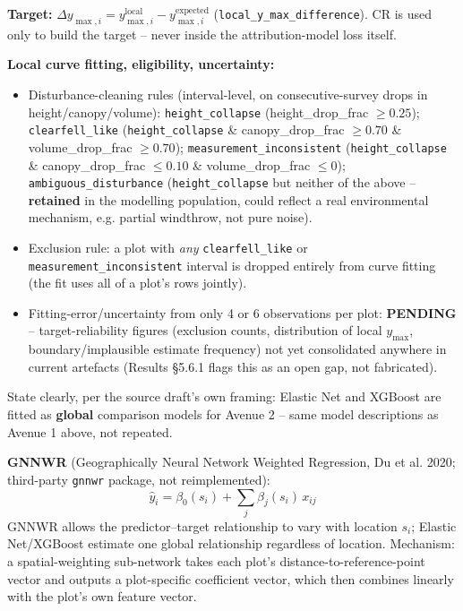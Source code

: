 \textbf{Target:} $\Delta y_{\max,i} = y_{\max,i}^{\text{local}} - y_{\max,i}^{\text{expected}}$
(\texttt{local\_y\_max\_difference}). CR is used only to build the target -- never inside the
attribution-model loss itself.

\textbf{Local curve fitting, eligibility, uncertainty:}
\begin{itemize}
\setlength\itemsep{0pt}
\item Disturbance-cleaning rules (interval-level, on consecutive-survey drops in
height/canopy/volume): \texttt{height\_collapse} (height\_drop\_frac $\ge 0.25$);
\texttt{clearfell\_like} (\texttt{height\_collapse} \& canopy\_drop\_frac $\ge 0.70$ \&
volume\_drop\_frac $\ge 0.70$); \texttt{measurement\_inconsistent} (\texttt{height\_collapse} \&
canopy\_drop\_frac $\le 0.10$ \& volume\_drop\_frac $\le 0$); \texttt{ambiguous\_disturbance}
(\texttt{height\_collapse} but neither of the above -- \textbf{retained} in the modelling
population, could reflect a real environmental mechanism, e.g. partial windthrow, not pure noise).
\item Exclusion rule: a plot with \emph{any} \texttt{clearfell\_like} or
\texttt{measurement\_inconsistent} interval is dropped entirely from curve fitting (the fit uses
all of a plot's rows jointly).
\item Fitting-error/uncertainty from only 4 or 6 observations per plot: \textbf{PENDING} --
target-reliability figures (exclusion counts, distribution of local $y_{\max}$, boundary/implausible
estimate frequency) not yet consolidated anywhere in current artefacts (Results \S5.6.1 flags this
as an open gap, not fabricated).
\end{itemize}

State clearly, per the source draft's own framing: Elastic Net and XGBoost are fitted as
\textbf{global} comparison models for Avenue 2 -- same model descriptions as Avenue 1 above, not
repeated.

\textbf{GNNWR} (Geographically Neural Network Weighted Regression, Du et al. 2020; third-party
\texttt{gnnwr} package, not reimplemented):
\[
\hat y_i = \beta_0(s_i) + \sum_j \beta_j(s_i)\, x_{ij}
\]
GNNWR allows the predictor--target relationship to vary with location $s_i$; Elastic Net/XGBoost
estimate one global relationship regardless of location. Mechanism: a spatial-weighting sub-network
takes each plot's distance-to-reference-point vector and outputs a plot-specific coefficient vector,
which then combines linearly with the plot's own feature vector.

